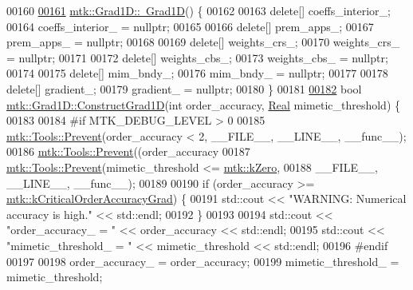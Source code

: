 \begin{DoxyCode}
00160 
\hypertarget{mtk__grad__1d_8cc_source_l00161}{}\hyperlink{classmtk_1_1Grad1D_a2f9b1d306c0f09f36145bb1e7e486b54}{00161} \hyperlink{classmtk_1_1Grad1D_a2f9b1d306c0f09f36145bb1e7e486b54}{mtk::Grad1D::~Grad1D}() \{
00162 
00163   \textcolor{keyword}{delete}[] coeffs\_interior\_;
00164   coeffs\_interior\_ = \textcolor{keyword}{nullptr};
00165 
00166   \textcolor{keyword}{delete}[] prem\_apps\_;
00167   prem\_apps\_ = \textcolor{keyword}{nullptr};
00168 
00169   \textcolor{keyword}{delete}[] weights\_crs\_;
00170   weights\_crs\_ = \textcolor{keyword}{nullptr};
00171 
00172   \textcolor{keyword}{delete}[] weights\_cbs\_;
00173   weights\_cbs\_ = \textcolor{keyword}{nullptr};
00174 
00175   \textcolor{keyword}{delete}[] mim\_bndy\_;
00176   mim\_bndy\_ = \textcolor{keyword}{nullptr};
00177 
00178   \textcolor{keyword}{delete}[] gradient\_;
00179   gradient\_ = \textcolor{keyword}{nullptr};
00180 \}
00181 
\hypertarget{mtk__grad__1d_8cc_source_l00182}{}\hyperlink{classmtk_1_1Grad1D_a74ef5245cfae6fd158bd7f563a0c2e52}{00182} \textcolor{keywordtype}{bool} \hyperlink{classmtk_1_1Grad1D_a74ef5245cfae6fd158bd7f563a0c2e52}{mtk::Grad1D::ConstructGrad1D}(\textcolor{keywordtype}{int} order\_accuracy, 
      \hyperlink{group__c01-roots_gac080bbbf5cbb5502c9f00405f894857d}{Real} mimetic\_threshold) \{
00183 
00184 \textcolor{preprocessor}{  #if MTK\_DEBUG\_LEVEL > 0}
00185   \hyperlink{classmtk_1_1Tools_a332324c6f25e66be9dff48c5987a3b9f}{mtk::Tools::Prevent}(order\_accuracy < 2, \_\_FILE\_\_, \_\_LINE\_\_, \_\_func\_\_);
00186   \hyperlink{classmtk_1_1Tools_a332324c6f25e66be9dff48c5987a3b9f}{mtk::Tools::Prevent}((order\_accuracy%
00187   \hyperlink{classmtk_1_1Tools_a332324c6f25e66be9dff48c5987a3b9f}{mtk::Tools::Prevent}(mimetic\_threshold <= \hyperlink{group__c01-roots_ga59a451a5fae30d59649bcda274fea271}{mtk::kZero},
00188                       \_\_FILE\_\_, \_\_LINE\_\_, \_\_func\_\_);
00189 
00190   \textcolor{keywordflow}{if} (order\_accuracy >= \hyperlink{group__c01-roots_ga295dd2f403c775ecd942c22b5a777496}{mtk::kCriticalOrderAccuracyGrad}) \{
00191     std::cout << \textcolor{stringliteral}{"WARNING: Numerical accuracy is high."} << std::endl;
00192   \}
00193 
00194   std::cout << \textcolor{stringliteral}{"order\_accuracy\_ = "} << order\_accuracy << std::endl;
00195   std::cout << \textcolor{stringliteral}{"mimetic\_threshold\_ = "} << mimetic\_threshold << std::endl;
00196 \textcolor{preprocessor}{  #endif}
00197 
00198   order\_accuracy\_ = order\_accuracy;
00199   mimetic\_threshold\_ = mimetic\_threshold;

\end{DoxyCode}

